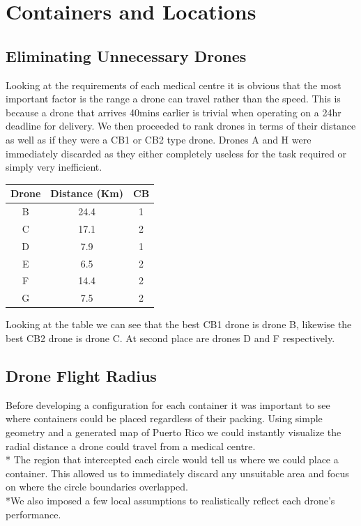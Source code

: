 \documentclass[a4paper,12pt]{article}
\begin{document}
\section{Containers and Locations}
\subsection{Eliminating Unnecessary Drones}
Looking at the requirements of each medical centre it is obvious that the most important factor is the range a drone can travel rather than the speed.
This is because a drone that arrives 40mins earlier is trivial when operating on a 24hr deadline for delivery.
We then proceeded to rank drones in terms of their distance as well as if they were a CB1 or CB2 type drone.
Drones A and H were immediately discarded as they either completely useless for the task required or simply very inefficient.

\begin{center}
\begin{tabular}{ |c|c|c| }
 \hline
 Drone & Distance (Km) & CB \\\hline
  B & 24.4 & 1 \\
  C & 17.1 & 2  \\
  D & 7.9 & 1 \\
  E & 6.5 & 2 \\
  F & 14.4 & 2 \\
  G & 7.5 & 2 \\
 \hline
\end{tabular}
\end{center}
Looking at the table we can see that the best CB1 drone is drone B, likewise the best CB2 drone is drone C. At second place are drones D and F respectively.

\subsection{Drone Flight Radius}
Before developing a configuration for each container it was important to see where containers could be placed regardless of their packing.
Using simple geometry and a generated map of Puerto Rico we could instantly visualize the radial distance a drone could travel from a medical centre.\\*
The region that intercepted each circle would tell us where we could place a container. This allowed us to immediately discard any unsuitable area and focus on where the circle boundaries overlapped.
\\*We also imposed a few local assumptions to realistically reflect each drone's performance.
\end{document}
